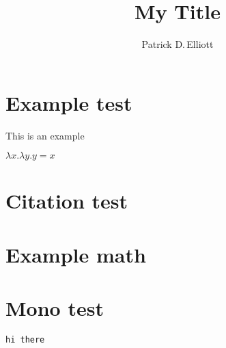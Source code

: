 \documentclass{scrartcl}
\title{My Title}
\author{Patrick D.\,Elliott}
\begin{document}
\maketitle

\section{Example test}

\begin{ex}
This is an example
\end{ex}

\begin{ex}
\(λ x . λ y . y = x\)
\end{ex}

\section{Citation test}

\section{Example math}

\section{Mono test}

\texttt{hi there}

\printbibliography
\end{document}
